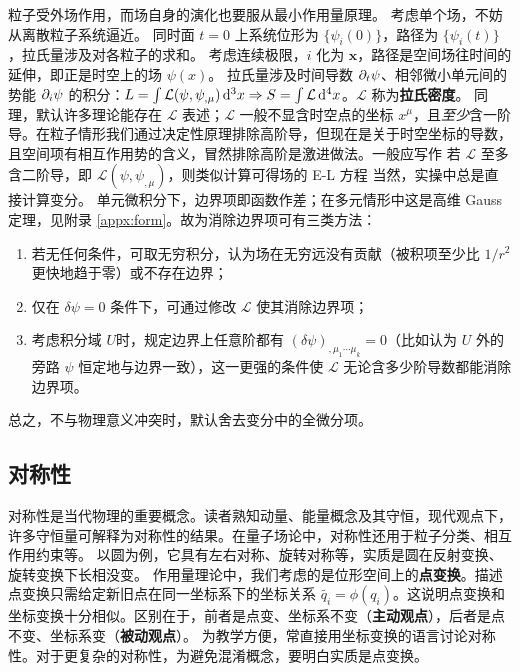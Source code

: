 粒子受外场作用，而场自身的演化也要服从最小作用量原理。
考虑单个场，不妨从离散粒子系统逼近。
同时面 $t=0$ 上系统位形为 $\{\psi_i(0)\}$，路径为 $\{\psi_i(t)\}$，拉氏量涉及对各粒子的求和。
考虑连续极限，$i$ 化为 $\bm x$，路径是空间场往时间的延伸，即正是时空上的场 $\psi(x)$。
拉氏量涉及时间导数 $\partial_t\psi$、相邻微小单元间的势能 $\partial_i\psi$ 的积分：$L=\int\mathcal L(\psi,\psi_{,\mu})\dd[3]{x}\Rightarrow S=\int \mathcal L \dd[4]{x}$。$\mathcal L$ 称为\textbf{拉氏密度}。
同理，默认许多理论能存在 $\mathcal L$ 表述；$\mathcal L$ 一般不显含时空点的坐标 $x^\mu$，且\textit{至少}含一阶导。在粒子情形我们通过决定性原理排除高阶导，但现在是关于时空坐标的导数，且空间项有相互作用势的含义，冒然排除高阶是激进做法。一般应写作
若 $\mathcal L$ 至多含二阶导，即 $\mathcal L(\psi,\psi_{,\mu})$，则类似计算可得场的 E-L 方程
当然，实操中总是直接计算变分。
单元微积分下，边界项即函数作差；在多元情形中这是高维 Gauss 定理，见附录 \ref{appx:form}。故为消除边界项可有三类方法：
\begin{enumerate}
    \item 若无任何条件，可取无穷积分，认为场在无穷远没有贡献（被积项至少比 $1/r^2$ 更快地趋于零）或不存在边界；
    \item 仅在 $\delta \psi=0$ 条件下，可通过修改 $\mathcal L$ 使其消除边界项；
    \item 考虑积分域 $U$时，规定边界上任意阶都有 $(\delta \psi)_{,\mu_1\cdots\mu_k}=0$（比如认为 $U$ 外的旁路 $\psi$ 恒定地与边界一致），这一更强的条件使 $\mathcal L$ 无论含多少阶导数都能消除边界项。
\end{enumerate}
总之，不与物理意义冲突时，默认舍去变分中的全微分项。

\subsection{对称性}

对称性是当代物理的重要概念。读者熟知动量、能量概念及其守恒，现代观点下，许多守恒量可解释为对称性的结果。在量子场论中，对称性还用于粒子分类、相互作用约束等。
以圆为例，它具有左右对称、旋转对称等，实质是圆在反射变换、旋转变换下长相没变。
作用量理论中，我们考虑的是位形空间上的\textbf{点变换}。描述点变换只需给定新旧点在同一坐标系下的坐标关系 $\tilde{q_i}=\phi(q_i)$。这说明点变换和坐标变换十分相似。区别在于，前者是点变、坐标系不变（\textbf{主动观点}），后者是点不变、坐标系变（\textbf{被动观点}）。
为教学方便，常直接用坐标变换的语言讨论对称性。对于更复杂的对称性，为避免混淆概念，要明白实质是点变换。

